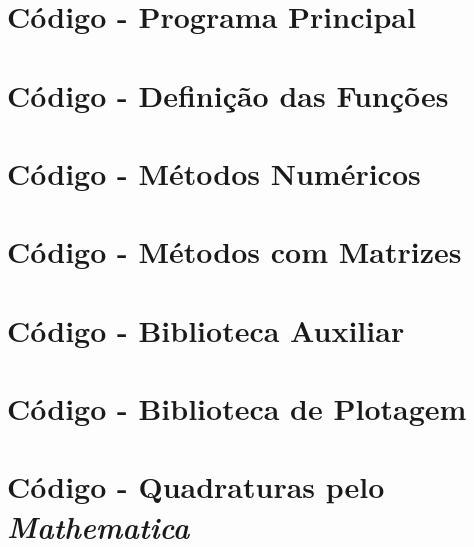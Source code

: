 \documentclass{homework}
\begin{document}
	\pagebreak
	\appendixpage
	\appendix \section*{Código - Programa Principal}
	
	\appendix \section*{Código - Definição das Funções}
	
	\appendix \section*{Código - Métodos Numéricos}
	
	\appendix \section*{Código - Métodos com Matrizes}
	
	\appendix \section*{Código - Biblioteca Auxiliar}
	
	\appendix \section*{Código - Biblioteca de Plotagem}
	
	\appendix \section*{Código - Quadraturas pelo \textit{Mathematica}}
	
%		
\end{document}
